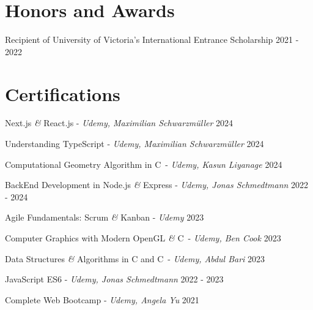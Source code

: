 \documentclass[a4paper,10pt]{article}
\begin{document}
\section{Honors and Awards}
\honorsawards
{Recipient of University of Victoria's International Entrance Scholarship}
{2021 - 2022}

\section{Certifications}

\honorsawards
{Next.js \textit{\&} React.js - \textit{Udemy, Maximilian Schwarzmüller}}
{2024}

\honorsawards
{Understanding TypeScript - \textit{Udemy, Maximilian Schwarzmüller}}
{2024}

\honorsawards
{Computational Geometry Algorithm in C\plusplus\ - \textit{Udemy, Kasun Liyanage}}
{2024}

\honorsawards
{BackEnd Development in Node.js \textit{\&} Express - \textit{Udemy, Jonas Schmedtmann}}
{2022 - 2024}

\honorsawards
{Agile Fundamentals: Scrum \textit{\&} Kanban - \textit{Udemy}}
{2023}

\honorsawards
{Computer Graphics with Modern OpenGL \textit{\&} C\plusplus\ - \textit{Udemy, Ben Cook}}
{2023}

\honorsawards
{Data Structures \textit{\&} Algorithms in C and C\plusplus\ - \textit{Udemy, Abdul Bari}}
{2023}

\honorsawards
{JavaScript ES6 - \textit{Udemy, Jonas Schmedtmann}}
{2022 - 2023}

\honorsawards
{Complete Web Bootcamp - \textit{Udemy, Angela Yu}}
{2021}
\end{document}
